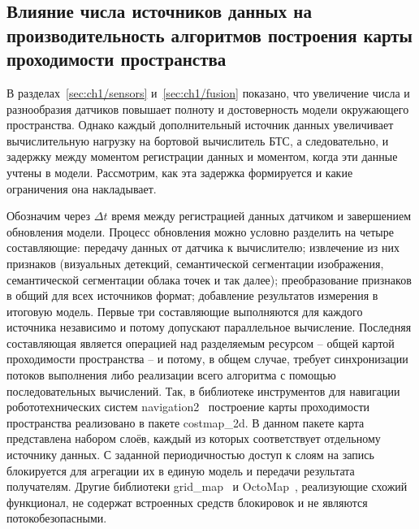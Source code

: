 \subsection{Влияние числа источников данных на производительность алгоритмов построения карты проходимости пространства}\label{sec:ch1/performance}

В разделах~\cref{sec:ch1/sensors} и~\cref{sec:ch1/fusion} показано, что увеличение числа и разнообразия датчиков повышает полноту и достоверность модели окружающего пространства. Однако каждый дополнительный источник данных увеличивает вычислительную нагрузку на бортовой вычислитель БТС, а следовательно, и задержку между моментом регистрации данных и моментом, когда эти данные учтены в модели. Рассмотрим, как эта задержка формируется и какие ограничения она накладывает.

Обозначим через $\Delta t$ время между регистрацией данных датчиком и завершением обновления модели. Процесс обновления можно условно разделить на четыре составляющие: передачу данных от датчика к вычислителю; извлечение из них признаков (визуальных детекций, семантической сегментации изображения, семантической сегментации облака точек и так далее); преобразование признаков в общий для всех источников формат; добавление результатов измерения в итоговую модель. Первые три составляющие выполняются для каждого источника независимо и потому допускают параллельное вычисление. Последняя составляющая является операцией над разделяемым ресурсом -- общей картой проходимости пространства -- и потому, в общем случае, требует синхронизации потоков выполнения либо реализации всего алгоритма с помощью последовательных вычислений. Так, в библиотеке инструментов для навигации робототехнических систем navigation2~\cite{Macenski2020-vz} построение карты проходимости пространства реализовано в пакете costmap\_2d. В данном пакете карта представлена набором слоёв, каждый из которых соответствует отдельному источнику данных. С заданной периодичностью доступ к слоям на запись блокируется для агрегации их в единую модель и передачи результата получателям. Другие библиотеки grid\_map~\cite{fankhauser2016universal} и OctoMap~\cite{hornung2013octomap}, реализующие схожий функционал, не содержат встроенных средств блокировок и не являются потокобезопасными.

